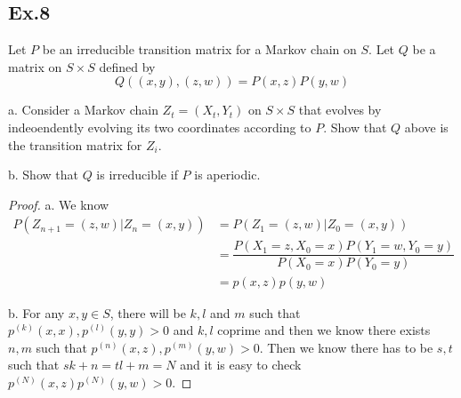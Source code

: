 \documentclass[lang=en,11pt,a4paper,citestyle =authoryear]{elegantpaper}
\begin{document}
\subsection*{Ex.8} 
Let $P$ be an irreducible transition matrix for a Markov chain on $S$. Let $Q$ be a matrix on $S\times S$ defined by
\[Q((x,y),(z,w)) = P(x,z)P(y,w)\]\par
a. Consider a Markov chain $Z_t = (X_t,Y_t)$ on $S\times S$ that evolves by indeoendently evolving its two coordinates according to $P$. Show that $Q$ above is the transition matrix for $Z_i$.\par
b. Show that $Q$ is irreducible if $P$ is aperiodic.
\begin{proof}
a. We know
\[
\begin{aligned}
P(Z_{n+1} = (z,w)|Z_n = (x,y)) &= P(Z_1 = (z,w)|Z_0 = (x,y)) \\ &= \dfrac{P(X_1 = z, X_0 = x)P(Y_1 = w, Y_0 = y)}{P(X_0 
= x)P(Y_0 = y)}\\ &= p(x,z)p(y,w)
\end{aligned}
\]\par
b. For any $x,y \in S$, there will be $k,l$ and $m$ such that $p^{(k)}(x,x),p^{(l)}(y,y) >0$ and $k,l$ coprime and then we know there exists $n,m$ such that $p^{(n)}(x,z), p^{(m)}(y,w) > 0$. Then we know there has to be $s,t$ such that $sk + n = tl + m = N$ and it is easy to check $p^{(N)}(x,z)p^{(N)}(y,w) > 0$. 
\end{proof}
\end{document}
